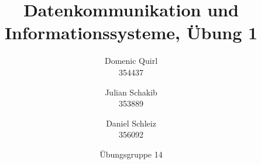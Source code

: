\documentclass{../exercisesheet}
\title{Datenkommunikation und Informationssysteme, Übung 1}
\author{
    Domenic Quirl \\ 354437
    \and
    Julian Schakib \\ 353889
    \and 
    Daniel Schleiz \\ 356092
}
\date{Übungsgruppe 14}
\begin{document}
\maketitle
\pointtable

\begin{exercise}{1}
\end{exercise}

\begin{exercise}{3}
	\begin{subexercise}
		
	\end{subexercise}

	\begin{subexercise}
		  
	\end{subexercise}
\end{exercise}


\begin{exercise}{5}
	\begin{subexercise}
	
	\end{subexercise}

	\begin{subexercise}
	
	\end{subexercise}

	\begin{subexercise} 
	
	\end{subexercise}
\end{exercise}

\begin{exercise}{1.5}
	\begin{subexercise}
	
	\end{subexercise}

	\begin{subexercise}
	
	\end{subexercise}

	\begin{subexercise} 
	
	\end{subexercise}
\end{exercise}

\begin{exercise}{4.5}
	\begin{subexercise}
	
	\end{subexercise}

	\begin{subexercise}
	
	\end{subexercise}
\end{exercise}
\end{document}
